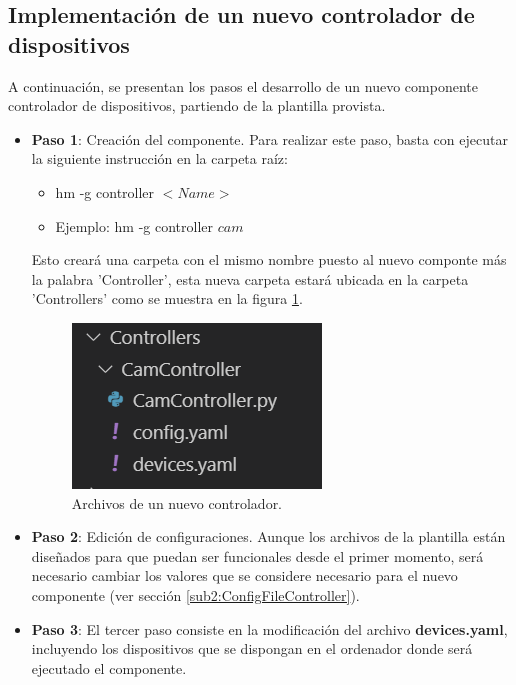     \subsection{Implementación de un nuevo controlador de dispositivos}
    \label{sub:DevelopingController}
        
        A continuación, se presentan los pasos el desarrollo de un nuevo componente controlador de dispositivos, partiendo de la plantilla provista.
    
        \begin{itemize}
            \item \textbf{Paso 1}: Creación del componente. Para realizar este paso, basta con ejecutar la siguiente instrucción en la carpeta raíz:
            \begin{itemize}
                \item hm -g controller \textit{$<Name>$}
                \item Ejemplo: hm -g controller \textit{$cam$}
            \end{itemize}
            Esto creará una carpeta con el mismo nombre puesto al nuevo componte más la palabra 'Controller', esta nueva carpeta estará ubicada en la carpeta 'Controllers' como se muestra en la figura \ref{fig:NewController}.
    
            \begin{figure}[ht!]
            	\centering
            	\includegraphics[width=0.4\linewidth]{imgs/03-Architecture/03-NewController.png}
            	\caption[Archivos de un nuevo controlador]{Archivos de un nuevo controlador.}
        	    \label{fig:NewController}
            \end{figure}%
            
            \item \textbf{Paso 2}: Edición de configuraciones. Aunque los archivos de la plantilla están diseñados para que puedan ser funcionales desde el primer momento, será necesario cambiar los valores que se considere necesario para el nuevo componente (ver sección \ref{sub2:ConfigFileController}).
            
            \item \textbf{Paso 3}: El tercer paso consiste en la modificación del archivo \textbf{devices.yaml}, incluyendo los dispositivos que se dispongan en el ordenador donde será ejecutado el componente.
            

\end{itemize}
